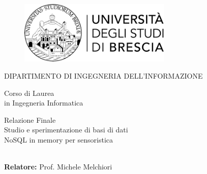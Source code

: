 \begin{titlepage}
    \begin{center}

        \begin{figure}[t]
            \centering
            \includegraphics[width=72.4mm,height=30mm]{img/logo_unibs}
        \end{figure}

        \vspace*{10mm}

        {\fontsize{17}{17}\selectfont
        DIPARTIMENTO DI INGEGNERIA DELL'INFORMAZIONE\\
        }

        \vspace*{10mm}

        {\fontsize{17}{17}\selectfont
        Corso di Laurea\\
        in Ingegneria Informatica\\

        }

        \vspace*{20mm}

        {\fontsize{20}{20}\selectfont
        Relazione Finale\\
        Studio e sperimentazione di basi di dati\\
        NoSQL in memory per sensoristica\\
        \\
        }

    \end{center}

    \vfill

    \begin{flushleft}
    {\fontsize{17}{17}\selectfont
    \textbf{Relatore:} Prof. Michele Melchiori
    }

    \end{flushleft}


\end{titlepage}
